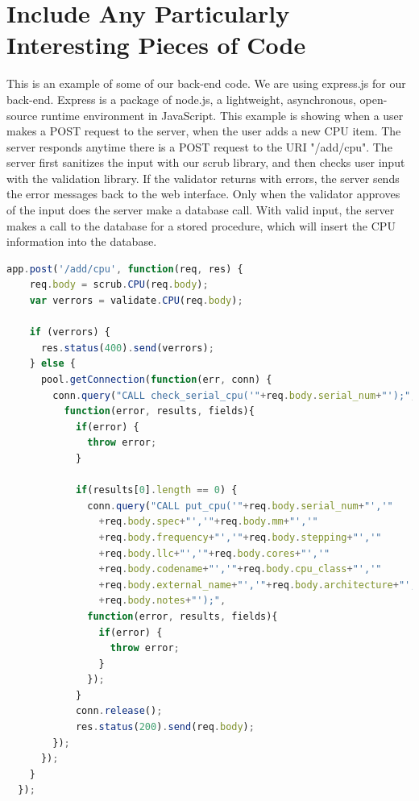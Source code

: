 \documentclass[10pt, onecolumn, twoside, peerreview]{IEEEtran}
\begin{document}
\clearpage

\section{Include Any Particularly Interesting Pieces of Code}
This is an example of some of our back-end code. We are using express.js for our back-end. Express is a package of node.js, a lightweight, asynchronous, open-source runtime environment in JavaScript. This example is showing when a user makes a POST request to the server, when the user adds a new CPU item. The server responds anytime there is a POST request to the URI "/add/cpu". The server first sanitizes the input with our scrub library, and then checks user input with the validation library. If the validator returns with errors, the server sends the error messages back to the web interface. Only when the validator approves of the input does the server make a database call. With valid input, the server makes a call to the database for a stored procedure, which will insert the CPU information into the database.
\begin{lstlisting}[language=Javascript, caption=Server-side Request Handler]
  app.post('/add/cpu', function(req, res) {
    req.body = scrub.CPU(req.body);
    var verrors = validate.CPU(req.body);

    if (verrors) {
      res.status(400).send(verrors);
    } else {
      pool.getConnection(function(err, conn) {
        conn.query("CALL check_serial_cpu('"+req.body.serial_num+"');",
          function(error, results, fields){
            if(error) {
              throw error;
            }
            
            if(results[0].length == 0) {
              conn.query("CALL put_cpu('"+req.body.serial_num+"','"
                +req.body.spec+"','"+req.body.mm+"','"
                +req.body.frequency+"','"+req.body.stepping+"','"
                +req.body.llc+"','"+req.body.cores+"','"
                +req.body.codename+"','"+req.body.cpu_class+"','"
                +req.body.external_name+"','"+req.body.architecture+"','"
                +req.body.notes+"');",
              function(error, results, fields){
                if(error) {
                  throw error;
                }
              });
            }
            conn.release();
            res.status(200).send(req.body);
        });
      });
    } 
  });
\end{lstlisting}
\end{document}
